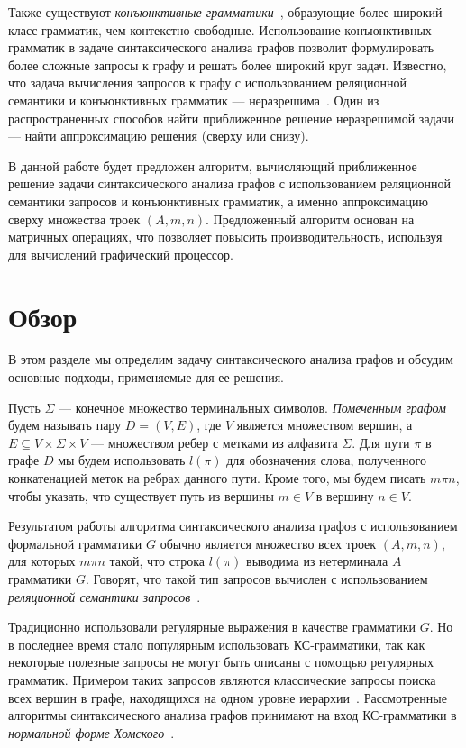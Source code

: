 \documentclass [a4paper] {article}
\begin{document}
		
	Также существуют \textit{конъюнктивные грамматики}~\cite{okhotin2001conjunctive}, образующие более широкий класс грамматик, чем контекстно-свободные. Использование конъюнктивных грамматик в задаче синтаксического анализа графов позволит формулировать более сложные запросы к графу и решать более широкий круг задач. Известно, что задача вычисления запросов к графу с использованием реляционной семантики и конъюнктивных грамматик --- неразрешима~\cite{hellingsRelational}. Один из распространенных способов найти приближенное решение неразрешимой задачи --- найти аппроксимацию решения (сверху или снизу).
	
	В данной работе будет предложен алгоритм, вычисляющий приближенное решение задачи синтаксического анализа графов с использованием реляционной семантики запросов и конъюнктивных грамматик, а именно аппроксимацию сверху множества троек $(A, m, n)$. Предложенный алгоритм основан на матричных операциях, что позволяет повысить производительность, используя для вычислений графический процессор.
	
	\section{Обзор}
	В этом разделе мы определим задачу синтаксического анализа графов и обсудим основные подходы, применяемые для ее решения.
	
	Пусть $\Sigma$ --- конечное множество терминальных символов. \textit{Помеченным графом} будем называть пару $D = (V, E)$, где $V$ является множеством вершин, а $E \subseteq V \times \Sigma \times V$ --- множеством ребер с метками из алфавита $\Sigma$. Для пути $\pi$ в графе $D$ мы будем использовать $l(\pi)$ для обозначения слова, полученного конкатенацией меток на ребрах данного пути. Кроме того, мы будем писать $m \pi n$, чтобы указать, что существует путь из вершины $m \in V$ в вершину $n \in V$.
	
	Результатом работы алгоритма синтаксического анализа графов с использованием формальной грамматики $G$ обычно является множество всех троек $(A, m, n)$, для которых $m \pi n$ такой, что строка $l(\pi)$ выводима из нетерминала $A$ грамматики $G$. Говорят, что такой тип запросов вычислен с использованием \textit{реляционной семантики запросов}~\cite{hellingsRelational}. 
	
	Традиционно использовали регулярные выражения в качестве грамматики $G$. Но в последнее время стало популярным использовать КС-грамматики, так как некоторые полезные запросы не могут быть описаны с помощью регулярных грамматик. Примером таких запросов являются классические запросы поиска всех вершин в графе, находящихся на одном уровне иерархии~\cite{FndDB}. Рассмотренные алгоритмы синтаксического анализа графов принимают на вход КС-грамматики в \textit{нормальной форме Хомского}~\cite{chomsky}.
	
\end{document}
